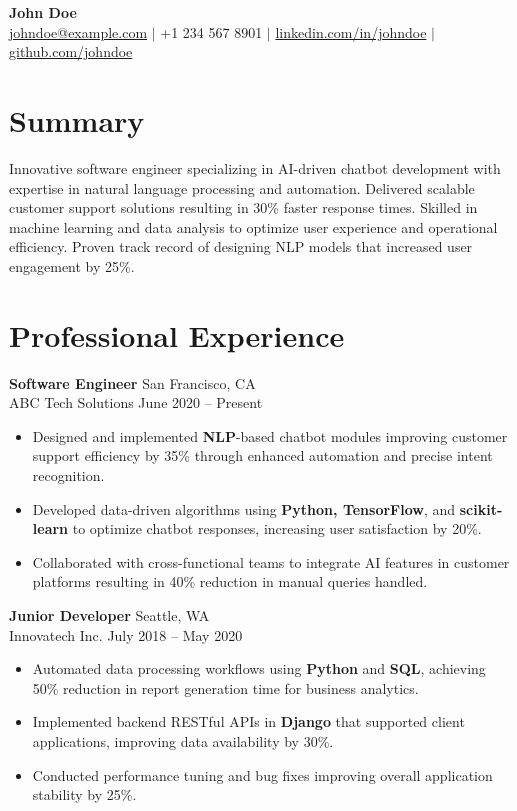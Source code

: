 \documentclass[a4paper,10pt]{article}
\begin{document}
\begin{center}
    {\LARGE \textbf{John Doe}}\\
    \vspace{2mm}
    \href{mailto:johndoe@example.com}{johndoe@example.com} $|$ +1 234 567 8901 $|$ \href{https://linkedin.com/in/johndoe}{linkedin.com/in/johndoe} $|$ \href{https://github.com/johndoe}{github.com/johndoe}
\end{center}

\section*{Summary}
Innovative software engineer specializing in AI-driven chatbot development with expertise in natural language processing and automation. Delivered scalable customer support solutions resulting in 30\% faster response times. Skilled in machine learning and data analysis to optimize user experience and operational efficiency. Proven track record of designing NLP models that increased user engagement by 25\%.

\section*{Professional Experience}

\textbf{Software Engineer} \hfill San Francisco, CA \\
ABC Tech Solutions \hfill June 2020 -- Present
\begin{itemize}
    \item Designed and implemented \textbf{NLP}-based chatbot modules improving customer support efficiency by 35\% through enhanced automation and precise intent recognition.
    \item Developed data-driven algorithms using \textbf{Python, TensorFlow}, and \textbf{scikit-learn} to optimize chatbot responses, increasing user satisfaction by 20\%.
    \item Collaborated with cross-functional teams to integrate AI features in customer platforms resulting in 40\% reduction in manual queries handled.
\end{itemize}

\textbf{Junior Developer} \hfill Seattle, WA \\
Innovatech Inc. \hfill July 2018 -- May 2020
\begin{itemize}
    \item Automated data processing workflows using \textbf{Python} and \textbf{SQL}, achieving 50\% reduction in report generation time for business analytics.
    \item Implemented backend RESTful APIs in \textbf{Django} that supported client applications, improving data availability by 30\%.
    \item Conducted performance tuning and bug fixes improving overall application stability by 25\%.
\end{itemize}
\end{document}
